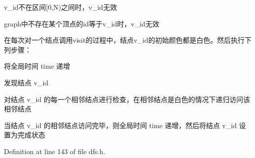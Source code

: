 \begin{DoxyItemize}
\item {\ttfamily v\+\_\+id}不在区间{\ttfamily \mbox{[}0,N)}之间时，{\ttfamily v\+\_\+id}无效
\item {\ttfamily graph}中不存在某个顶点的{\ttfamily id}等于{\ttfamily v\+\_\+id}时，{\ttfamily v\+\_\+id}无效
\end{DoxyItemize}

在每次对一个结点调用visit的过程中，结点v\+\_\+id的初始颜色都是白色。然后执行下列步骤：


\begin{DoxyItemize}
\item 将全局时间 time 递增
\item 发现结点 v\+\_\+id
\item 对结点 v\+\_\+id 的每一个相邻结点进行检查，在相邻结点是白色的情况下递归访问该相邻结点
\item 当结点 v\+\_\+id 的相邻结点访问完毕，则全局时间 time 递增，然后将结点 v\+\_\+id 设置为完成状态 
\end{DoxyItemize}

Definition at line 143 of file dfs.\+h.

